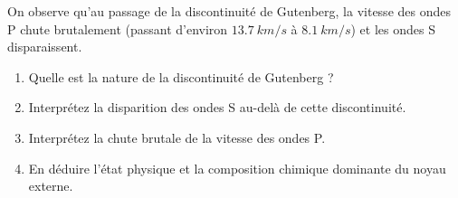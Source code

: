 \documentclass[11pt]{article}
\begin{document}
\begin{exercice}
On observe qu'au passage de la discontinuité de Gutenberg, la vitesse des ondes P chute brutalement (passant d'environ $\SI{13.7}{km/s}$ à $\SI{8.1}{km/s}$) et les ondes S disparaissent.
\begin{enumerate}
    \item Quelle est la nature de la discontinuité de Gutenberg ?
    \item Interprétez la disparition des ondes S au-delà de cette discontinuité.
    \item Interprétez la chute brutale de la vitesse des ondes P.
    \item En déduire l'état physique et la composition chimique dominante du noyau externe.
\end{enumerate}
\end{exercice}
\end{document}
